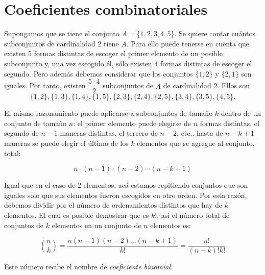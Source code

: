 \section{Coeficientes combinatoriales}


Supongamos que se tiene el conjunto $A = \{1,2,3,4,5\}$. 
Se quiere contar cu\'antos subconjuntos de cardinalidad 2 tiene $A$.
Para ello puede tenerse en cuenta que existen 5 formas distintas de escoger el primer elemento de un posible subconjunto y, una vez escogido \'el, s\'olo existen 4 formas distintas de escoger el segundo. 
Pero adem\'as debemos considerar que los conjuntos $\{1,2\}$ y $\{2,1\}$ son iguales.
Por tanto, existen $\dfrac{5\cdot 4}{2}$ subconjuntos de $A$ de cardinalidad 2.
Ellos son
\[
	\{1,2\}, \{1,3\}, \{1,4\}, \{1,5\}, \{2,3\}, \{2,4\}, \{2,5\},
	\{3,4\}, \{3,5\}, \{4,5\}.
\]

El mismo razonamiento puede aplicarse a subconjuntos de tamaño $k$ dentro de un conjunto de tamaño $n$: el primer elemento puede elegirse de $n$ formas distintas, el segundo de $n-1$ maneras distintas, el tercero de $n-2$, etc.. hasta de $n-k+1$ maneras se puede elegir el último de los $k$ elementos que se agregue al conjunto, total:

$$ n\cdot (n-1) \cdot (n-2) \cdots (n-k+1) $$

Igual que en el caso de 2 elementos, acá estamos repitiendo conjuntos que son iguales solo que sus elementos fueron escogidos en otro orden.
Por esta razón, debemos dividir por el número de ordenamientos distintos que hay de $k$ elementos.
El cual es posible demostrar que es $k!$, así el número total de conjuntos de $k$ elementos en un conjunto de $n$ elementos es:


\[
	\binom{n}{k} = \frac{n(n-1)(n-2)...(n-k+1)}{k!}  = \frac{n!}{(n-k)!k!}
\]

Este n\'umero recibe el nombre de {\em coeficiente binomial}.

\medskip

